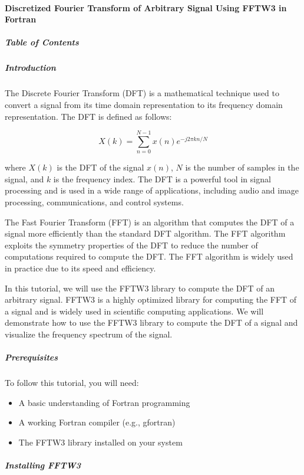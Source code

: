 \paragraph{Discretized Fourier Transform of Arbitrary Signal Using FFTW3 in Fortran}

\subparagraph{Table of Contents}

\subparagraph{Introduction}

The Discrete Fourier Transform (DFT) is a mathematical technique used to convert a signal from its time domain representation to its frequency domain representation. The DFT is defined as follows:

\begin{equation}
X(k) = \sum_{n=0}^{N-1} x(n) e^{-j2\pi kn/N}
\end{equation}

where $X(k)$ is the DFT of the signal $x(n)$, $N$ is the number of samples in the signal, and $k$ is the frequency index. The DFT is a powerful tool in signal processing and is used in a wide range of applications, including audio and image processing, communications, and control systems.

The Fast Fourier Transform (FFT) is an algorithm that computes the DFT of a signal more efficiently than the standard DFT algorithm. The FFT algorithm exploits the symmetry properties of the DFT to reduce the number of computations required to compute the DFT. The FFT algorithm is widely used in practice due to its speed and efficiency.

In this tutorial, we will use the FFTW3 library to compute the DFT of an arbitrary signal. FFTW3 is a highly optimized library for computing the FFT of a signal and is widely used in scientific computing applications. We will demonstrate how to use the FFTW3 library to compute the DFT of a signal and visualize the frequency spectrum of the signal.

\subparagraph{Prerequisites}

To follow this tutorial, you will need:

\begin{itemize}
\item A basic understanding of Fortran programming
\item A working Fortran compiler (e.g., gfortran)
\item The FFTW3 library installed on your system
\end{itemize}

\subparagraph{Installing FFTW3}

